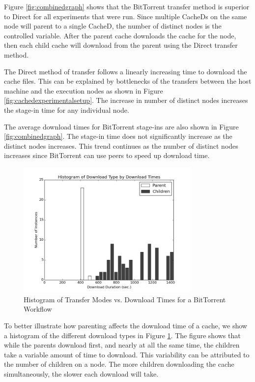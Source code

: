 Figure \ref{fig:combinedgraph} shows that the BitTorrent transfer method is superior to Direct for all experiments that were run.  Since multiple CacheDs on the same node will parent to a single CacheD, the number of distinct nodes is the controlled variable.  After the parent cache downloads the cache for the node, then each child cache will download from the parent using the Direct transfer method.

The Direct method of transfer follows a linearly increasing time to download the cache files.  This can be explained by bottlenecks of the transfers between the host machine and the execution nodes as shown in Figure \ref{fig:cachedexperimentalsetup}.  The increase in number of distinct nodes increases the stage-in time for any individual node.

The average download times for BitTorrent stage-ins are also shown in Figure \ref{fig:combinedgraph}.  The stage-in time does not significantly increase as the distinct nodes increases.  This trend continues as the number of distinct nodes increases since BitTorrent can use peers to speed up download time.

\begin{figure}[h!t]
\centering
\includegraphics[width=0.8\textwidth]{images/modes_vs_downloadtimes-grayscale.png}
\caption{Histogram of Transfer Modes vs. Download Times for a BitTorrent Workflow}
\label{fig:histmethod}
\end{figure}

To better illustrate how parenting affects the download time of a cache, we show a histogram of the different download types in Figure \ref{fig:histmethod}.  The figure shows that while the parents download first, and nearly at all the same time, the children take a variable amount of time to download.  This variability can be attributed to the number of children on a node.  The more children downloading the cache simultaneously, the slower each download will take. 

